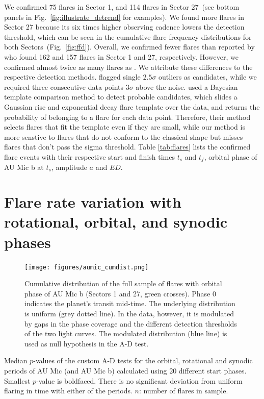 \documentclass[fleqn,usenatbib]{mnras}%
\begin{document}
We confirmed 75 flares in Sector 1, and 114 flares in Sector 27~(see bottom panels in Fig.~\ref{fig:illustrate_detrend} for examples). We found more flares in Sector 27 because its six times higher observing cadence lowers the detection threshold, which can be seen in the cumulative flare frequency distributions for both Sectors~(Fig.~\ref{fig:ffd}). Overall, we confirmed fewer flares than reported by \citet{martioli2021new} who found 162 and 157 flares in Sector 1 and 27, respectively. However, we confirmed almost twice as many flares as \citet{gilbert2021flares}. We attribute these differences to the respective detection methods. \citet{martioli2021new} flagged single $2.5\sigma$ outliers as candidates, while we required three consecutive data points $3\sigma$ above the noise. \citet{gilbert2021flares} used a Bayesian template comparison method to detect probable candidates, which slides a Gaussian rise and exponential decay flare template over the data, and returns the probability of belonging to a flare for each data point. Therefore, their method selects flares that fit the template even if they are small, while our method is more senstive to flares that do not conform to the classical shape but misses flares that don't pass the sigma threshold. Table \ref{tab:flares} lists the confirmed flare events with their respective start and finish times $t_s$ and $t_f$, orbital phase of AU Mic b at $t_s$, amplitude $a$ and $ED$.

\section{Flare rate variation with rotational, orbital, and synodic phases}
\label{sec:phases}


\begin{figure}
\texttt{[image: figures/aumic\_cumdist.png]} 
\caption{Cumulative distribution of the full sample of flares with orbital phase of AU Mic b (Sectors 1 and 27, green crosses). Phase 0 indicates the planet's transit mid-time. The underlying distribution is uniform (grey dotted line). In the data, however, it is modulated by gaps in the phase coverage and the different detection thresholds of the two light curves. The modulated distribution (blue line) is used as null hypothesis in the A-D test.}
\label{fig:cumdist}
\end{figure}

\begin{table}
\caption{Median $p$-values of the custom A-D tests for the orbital, rotational and synodic periods of AU Mic (and AU Mic b) calculated using 20 different start phases. Smallest $p$-value is boldfaced. There is no significant deviation from uniform flaring in time with either of the periods. $n$: number of flares in sample.}
\centering

\label{tab:pvals}
\end{table}
\end{document}
